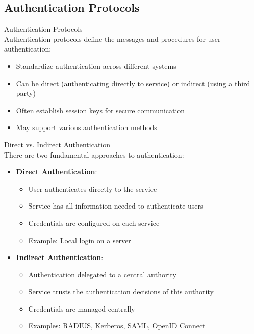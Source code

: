 \subsection{Authentication Protocols}

\begin{definition}{Authentication Protocols}\\
Authentication protocols define the messages and procedures for user authentication:
\begin{itemize}
    \item Standardize authentication across different systems
    \item Can be direct (authenticating directly to service) or indirect (using a third party)
    \item Often establish session keys for secure communication
    \item May support various authentication methods
\end{itemize}
\end{definition}

\begin{concept}{Direct vs. Indirect Authentication}\\
There are two fundamental approaches to authentication:
\begin{itemize}
    \item \textbf{Direct Authentication}:
    \begin{itemize}
        \item User authenticates directly to the service
        \item Service has all information needed to authenticate users
        \item Credentials are configured on each service
        \item Example: Local login on a server
    \end{itemize}
    \item \textbf{Indirect Authentication}:
    \begin{itemize}
        \item Authentication delegated to a central authority
        \item Service trusts the authentication decisions of this authority
        \item Credentials are managed centrally
        \item Examples: RADIUS, Kerberos, SAML, OpenID Connect
    \end{itemize}
\end{itemize}
\end{concept}

